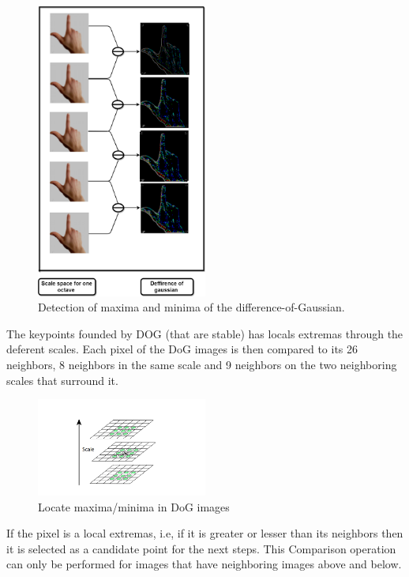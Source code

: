 \begin{figure}[H]
\centering
\includegraphics[width=0.5\textwidth]{img/scaleanddog.png}
\caption{ Detection of maxima and minima of the difference-of-Gaussian.}
\label{fig:sift2}
\end{figure}


The keypoints founded by DOG (that are stable) has  locals extremas through the deferent scales. Each pixel of the DoG images is then compared to its 26 neighbors, 8 neighbors in the same scale and 9 neighbors on the two neighboring scales that surround it.

\begin{figure}[H]
\centering
\includegraphics[width=0.5\textwidth]{img/sift2.PNG}
\caption{ Locate maxima/minima in DoG images }
\label{fig:sift4}
\end{figure}
If the pixel  is a local extremas, i.e, if it is greater or lesser  than its neighbors then it is selected as a candidate point for the next steps. This Comparison operation can only be performed for images that have neighboring images above and below.


